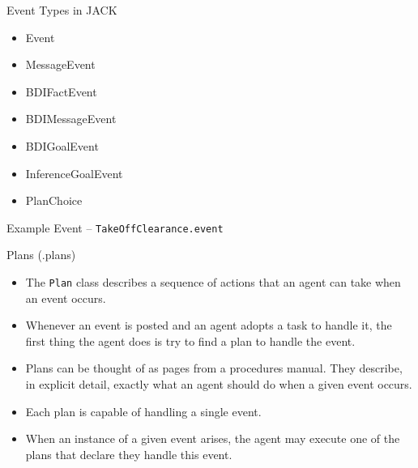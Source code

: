 \documentclass[aspectratio=1610,xcolor=dvipsnames,t]{beamer}
\newcommand{\showcode}[1]{\begin{mdframed}[style=code] %
                          \end{mdframed}%
}
\begin{document}
\begin{frame}{Event Types in JACK} 
    \begin{itemize}
        \item Event
        \item MessageEvent
        \item BDIFactEvent
        \item BDIMessageEvent
        \item BDIGoalEvent
        \item InferenceGoalEvent
        \item PlanChoice
    \end{itemize} 
\end{frame} 

\begin{frame}{Example Event -- \texttt{TakeOffClearance.event}}
    \showcode{takeoffevent.java} 
\end{frame} 

\begin{frame}{Plans (.plans)} 
    \begin{itemize}
        \item The \texttt{Plan} class describes a sequence of actions that an 
              agent can take when an event occurs. 
        \item Whenever an event is posted and an agent adopts a 
              task to handle it, the first thing the agent does is 
              try to find a plan to handle the event.
        \item Plans can be thought of as pages from a procedures manual. 
              They describe, in explicit detail, exactly what an agent 
              should do when a given event occurs. 
        \item Each plan is capable of handling a single event. 
        \item When an instance of a given event arises, 
              the agent may execute one of the plans that 
              declare they handle this event. 
    \end{itemize} 
\end{frame} 
\end{document}
